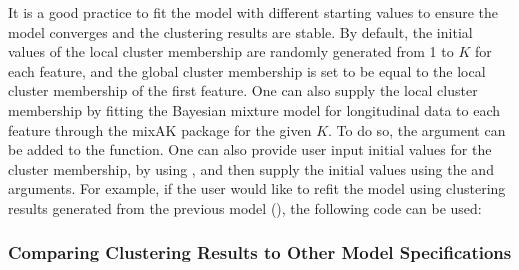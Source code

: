 It is a good practice to fit the model with different starting values to ensure the model converges and the clustering results are stable. By default, the initial values of the local cluster membership are randomly generated from 1 to $K$ for each feature, and the global cluster membership is set to be equal to the local cluster membership of the first feature. One can also supply the local cluster membership by fitting the Bayesian mixture model for longitudinal data to each feature through the mixAK package for the given $K$. To do so, the argument  can be added to the  function. One can also provide user input initial values for the cluster membership, by using , and then supply the initial values using the  and  arguments. For example, if the user would like to refit the model using clustering results generated from the previous model  (), the following code can be used:  


\subsubsection{Comparing Clustering Results to Other Model Specifications}

